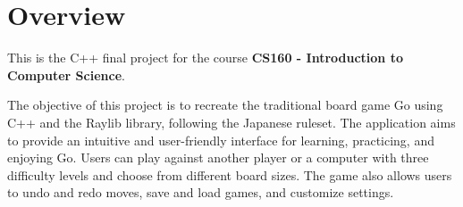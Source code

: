 \section{Overview}

This is the C++ final project for the course \textbf{CS160 - Introduction to Computer Science}.

The objective of this project is to recreate the traditional board game Go using C++ and the Raylib library, following the Japanese ruleset. The application aims to provide an intuitive and user-friendly interface for learning, practicing, and enjoying Go. Users can play against another player or a computer with three difficulty levels and choose from different board sizes. The game also allows users to undo and redo moves, save and load games, and customize settings.
